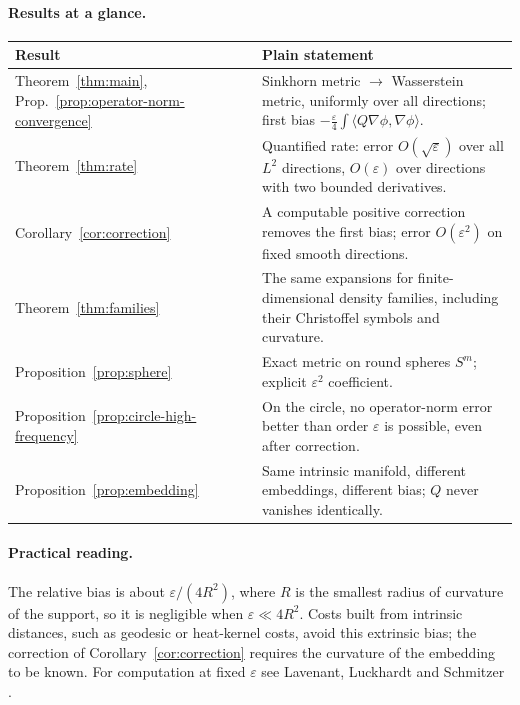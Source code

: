 \documentclass[11pt,a4paper]{article}
\theoremstyle{definition}\newtheorem{definition}[theorem]{Definition}
\theoremstyle{remark}\newtheorem{remark}[theorem]{Remark}
\newcommand{\eps}{\varepsilon}
\begin{document}
\paragraph{Results at a glance.}
\begin{center}\small
\begin{tabular}{p{}p{}}
\toprule
Result & Plain statement\\
\midrule
Theorem~\ref{thm:main}, Prop.~\ref{prop:operator-norm-convergence} & Sinkhorn metric $\to$ Wasserstein metric, uniformly over all directions; first bias $-\tfrac\eps4\int\langle Q\nabla\phi,\nabla\phi\rangle$.\\
Theorem~\ref{thm:rate} & Quantified rate: error $O(\sqrt\eps)$ over all $L^2$ directions, $O(\eps)$ over directions with two bounded derivatives.\\
Corollary~\ref{cor:correction} & A computable positive correction removes the first bias; error $O(\eps^2)$ on fixed smooth directions.\\
Theorem~\ref{thm:families} & The same expansions for finite-dimensional density families, including their Christoffel symbols and curvature.\\
Proposition~\ref{prop:sphere} & Exact metric on round spheres $S^m$; explicit $\eps^2$ coefficient.\\
Proposition~\ref{prop:circle-high-frequency} & On the circle, no operator-norm error better than order $\eps$ is possible, even after correction.\\
Proposition~\ref{prop:embedding} & Same intrinsic manifold, different embeddings, different bias; $Q$ never vanishes identically.\\
\bottomrule
\end{tabular}
\end{center}

\paragraph{Practical reading.} The relative bias is about $\eps/(4R^2)$, where $R$ is the smallest radius of curvature of the support, so it is negligible when $\eps\ll4R^2$. Costs built from intrinsic distances, such as geodesic or heat-kernel costs, avoid this extrinsic bias; the correction of Corollary~\ref{cor:correction} requires the curvature of the embedding to be known. For computation at fixed $\eps$ see Lavenant, Luckhardt and Schmitzer \cite{LLS}.
\end{document}
